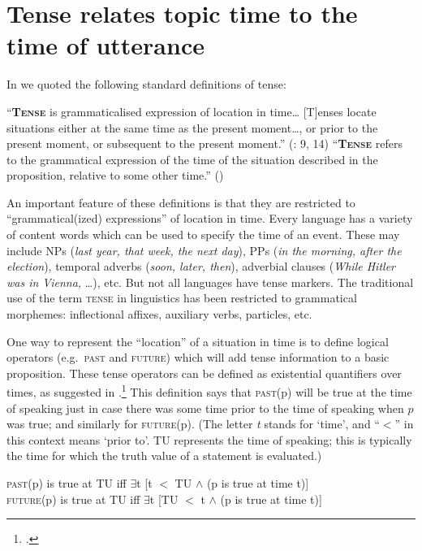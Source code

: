 \section{Tense relates topic time to the time of utterance}\label{sec:21.2}

In  we quoted the following standard definitions of tense:


\ea \label{ex:21.2}
\ea   “\textbf{\textsc{Tense}} is grammaticalised expression of location in time… [T]enses locate situations either at the same time as the present moment…, or prior to the present moment, or subsequent to the present moment.” (\citealt{Comrie1985}: 9, 14)
\ex   “\textbf{\textsc{Tense}} refers to the grammatical expression of the time of the situation described in the proposition, relative to some other time.” (\citealt[144]{Bybee1992})
\z \z


An important feature of these definitions is that they are restricted to “grammatical(ized) expressions” of location in time. Every language has a variety of content words which can be used to specify the time of an event. These may include NPs (\textit{last year, that week, the next day}), PPs (\textit{in the morning, after the election}), temporal adverbs (\textit{soon, later, then}), adverbial clauses (\textit{While Hitler was in Vienna,} …), etc. But not all languages have tense markers. The traditional use of the term \textsc{tense} in linguistics has been restricted to grammatical morphemes: inflectional affixes, auxiliary verbs, particles, etc.



One way to represent the “location” of a situation in time is to define logical operators (e.g.~\textsc{past} and \textsc{future}) which will add tense information to a basic proposition. These tense operators can be defined as existential quantifiers over times, as suggested in .\footnote{\citet{Prior1957,Prior1967}.} This definition says that \textsc{past}(p) will be true at the time of speaking just in case there was some time prior to the time of speaking when $p$ was true; and similarly for \textsc{future}(p). (The letter \textit{t} stands for ‘time’, and “{$<$}” in this context means ‘prior to’. TU represents the time of speaking; this is typically the time for which the truth value of a statement is evaluated.)


\ea \label{ex:21.3}
\textsc{past}(p) is true at TU  iff  ${\exists}$t [t {$<$} TU $\wedge$ (p is true at time t)]\\
\textsc{future}(p) is true at TU  iff  ${\exists}$t [TU {$<$} t $\wedge$ (p is true at time t)]
\z


